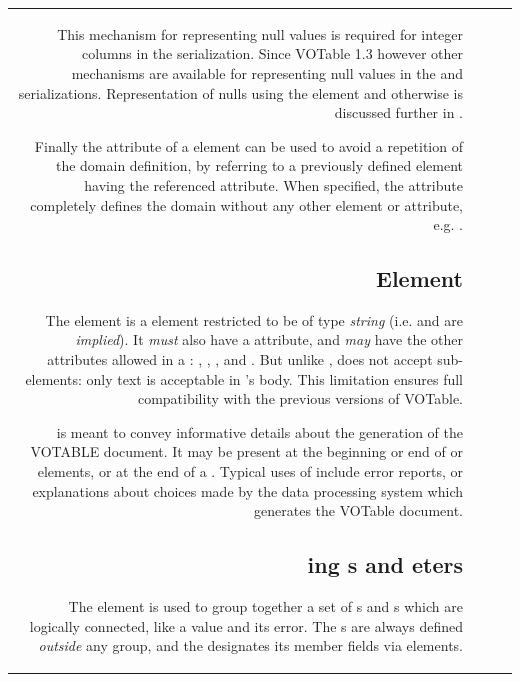 \begin{tabular}{RRCp{0.8\textwidth}}
\begin{center}
This mechanism for representing null values is required for integer
columns in the  serialization.
Since VOTable 1.3 however other mechanisms are available for representing
null values in the  and  serializations.
Representation of nulls using the  element and otherwise
is discussed further in .

Finally the  attribute of a  element
can be used to avoid a repetition of the domain definition,
by referring to a previously defined  element
having the referenced  attribute. 
When specified, the   attribute completely defines
the domain without any other element or attribute, e.g.
.

\subsection{\texorpdfstring{ Element}
                           {INFO Element}}
\label{elem:INFO}
The  element is a {} element restricted 
to be of type {\em string}
(i.e.  and  are {\em implied}).
It {\em must} also have a  attribute,
and {\em may} have the other attributes allowed in a :
, , ,  and .
But unlike ,  does not accept sub-elements:
only text is acceptable in 's body. This limitation ensures full 
compatibility with the previous versions of VOTable.

 is meant to convey informative details about the
generation of the {VOTABLE} document.
It may be present
at the beginning or end of  or  elements,
or at the end of a . Typical uses of 
include error reports, or explanations about choices made by the
data processing system which generates the VOTable document.

\subsection{\texorpdfstring{ing s and eters}
                           {GROUPing FIELDs and PARAMeters}}
\label{sec:group}
\label{elem:GROUP}
\label{elem:FIELDref}
\label{elem:PARAMref}

The  element is used 
to group together a set of s and s
which are logically connected, like a value and its error. 
The s are always defined {\em outside} any group,
and the  designates its member fields via  
 elements.


\end{center}
\end{tabular}
